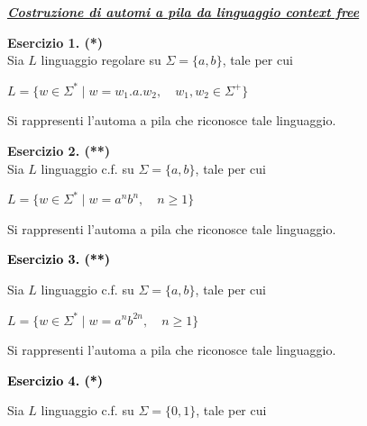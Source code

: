 \documentclass[a4paper,10pt]{article}
\begin{document}
{\normalsize
\begin{itemize}[label=, leftmargin=0pt]

\item \underline{\textit{\textbf{Costruzione di automi a pila da linguaggio context free}}}
    
    
    \item \textbf{Esercizio 1. (*)}\\ 
    Sia $L$ linguaggio regolare su $\Sigma=\{a,b\}$, tale per cui 
    {\begin{center}
        $L = \{ w\in \Sigma^* \mid w=w_1.a.w_2,\quad w_1, w_2\in \Sigma^+\}$\\
    \end{center}}
    Si rappresenti l'automa a pila che riconosce tale linguaggio.\\


    \item \textbf{Esercizio 2. (**)}\\ 
    Sia $L$ linguaggio c.f. su $\Sigma=\{a,b\}$, tale per cui 
    {\begin{center}
        $L = \{ w\in \Sigma^* \mid w=a^nb^n,\quad n\geq1\}$\\
    \end{center}}
    Si rappresenti l'automa a pila che riconosce tale linguaggio.

    \textcolor{black}{\item \textbf{Esercizio 3. (**)}\\ }
    Sia $L$ linguaggio c.f. su $\Sigma=\{a,b\}$, tale per cui 
    {\begin{center}
        $L = \{ w\in \Sigma^* \mid w=a^nb^{2n},\quad n\geq 1\}$\\
    \end{center}} 
    Si rappresenti l'automa a pila che riconosce tale linguaggio.
    
    \textcolor{black}{\item \textbf{Esercizio 4. (*)}\\ }
    Sia $L$ linguaggio c.f. su $\Sigma=\{0,1\}$, tale per cui 

    {
  \small
    \begin{center}
\end{center}}
\end{itemize}}
\end{document}
